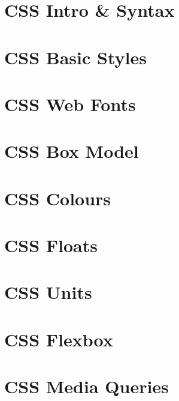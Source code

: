 \documentclass[b5paper,openany]{book}
\begin{document}
\tp


\tableofcontents



\chapter{CSS Intro \& Syntax}


\chapter{CSS Basic Styles}


\chapter{CSS Web Fonts}


\chapter{CSS Box Model}


\chapter{CSS Colours}


\chapter{CSS Floats}


\chapter{CSS Units}


\chapter{CSS Flexbox}


\chapter{CSS Media Queries}

\end{document}
